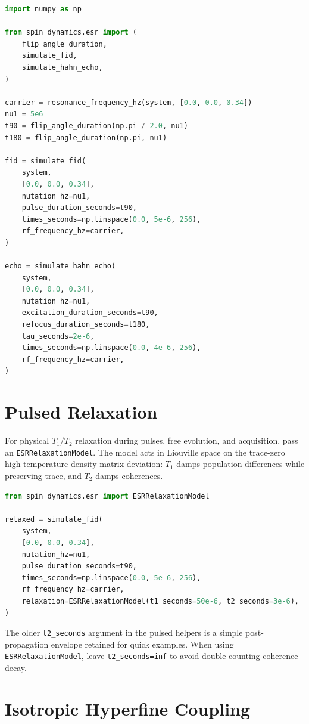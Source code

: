 \documentclass[11pt,oneside]{report}
\newcommand{\code}[1]{\texttt{#1}}
\begin{document}
\begin{lstlisting}[language=Python]
import numpy as np

from spin_dynamics.esr import (
    flip_angle_duration,
    simulate_fid,
    simulate_hahn_echo,
)

carrier = resonance_frequency_hz(system, [0.0, 0.0, 0.34])
nu1 = 5e6
t90 = flip_angle_duration(np.pi / 2.0, nu1)
t180 = flip_angle_duration(np.pi, nu1)

fid = simulate_fid(
    system,
    [0.0, 0.0, 0.34],
    nutation_hz=nu1,
    pulse_duration_seconds=t90,
    times_seconds=np.linspace(0.0, 5e-6, 256),
    rf_frequency_hz=carrier,
)

echo = simulate_hahn_echo(
    system,
    [0.0, 0.0, 0.34],
    nutation_hz=nu1,
    excitation_duration_seconds=t90,
    refocus_duration_seconds=t180,
    tau_seconds=2e-6,
    times_seconds=np.linspace(0.0, 4e-6, 256),
    rf_frequency_hz=carrier,
)
\end{lstlisting}

\section{Pulsed Relaxation}

For physical \(T_1/T_2\) relaxation during pulses, free evolution, and
acquisition, pass an \code{ESRRelaxationModel}. The model acts in
Liouville space on the trace-zero high-temperature density-matrix deviation:
\(T_1\) damps population differences while preserving trace, and \(T_2\) damps
coherences.

\begin{lstlisting}[language=Python]
from spin_dynamics.esr import ESRRelaxationModel

relaxed = simulate_fid(
    system,
    [0.0, 0.0, 0.34],
    nutation_hz=nu1,
    pulse_duration_seconds=t90,
    times_seconds=np.linspace(0.0, 5e-6, 256),
    rf_frequency_hz=carrier,
    relaxation=ESRRelaxationModel(t1_seconds=50e-6, t2_seconds=3e-6),
)
\end{lstlisting}

The older \code{t2\_seconds} argument in the pulsed helpers is a simple
post-propagation envelope retained for quick examples. When using
\code{ESRRelaxationModel}, leave \code{t2\_seconds=inf} to avoid double-counting
coherence decay.

\section{Isotropic Hyperfine Coupling}
\end{document}
